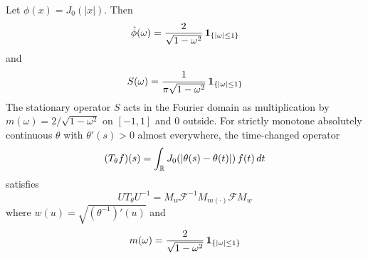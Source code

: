 \documentclass{article}
\newcommand{\cdummy}{\cdot}
\newcommand{\tmtextbf}[1]{\text{{\bfseries{#1}}}}
\begin{document}
\begin{example}
  Let $\phi (x) = J_0 (|x|)$. Then
  \begin{equation}
    \hat{\phi} (\omega) = \frac{2}{\sqrt{1 - \omega^2}} \hspace{0.17em}
    \text{\tmtextbf{1}}_{\{| \omega | \le 1\}}
  \end{equation}
  and
  \begin{equation}
    S (\omega) = \frac{1}{\pi \sqrt{1 - \omega^2}} \hspace{0.17em}
    \text{\tmtextbf{1}}_{\{| \omega | \le 1\}}
  \end{equation}
  The stationary operator $S$ acts in the Fourier domain as multiplication by
  $m (\omega) = 2 / \sqrt{1 - \omega^2}$ on $[- 1, 1]$ and $0$ outside. For
  strictly monotone absolutely continuous $\theta$ with $\theta' (s) > 0$
  almost everywhere, the time-changed operator
  \begin{equation}
    (T_{\theta} f) (s) = \int_{\mathbb{R}} J_0 (| \theta (s) - \theta (t) |) 
    \hspace{0.17em} f (t)  \hspace{0.17em} dt
  \end{equation}
  satisfies
  \begin{equation}
    UT_{\theta} U^{- 1} = M_w \mathcal{F}^{- 1} M_{m (\cdummy)} \mathcal{F}M_w
  \end{equation}
  where $w (u) = \sqrt{(\theta^{- 1})' (u)}$ and
  \begin{equation}
    m (\omega) = \frac{2}{\sqrt{1 - \omega^2}} \hspace{0.17em}
    \text{\tmtextbf{1}}_{\{| \omega | \le 1\}}
  \end{equation}
\end{example}
\end{document}
